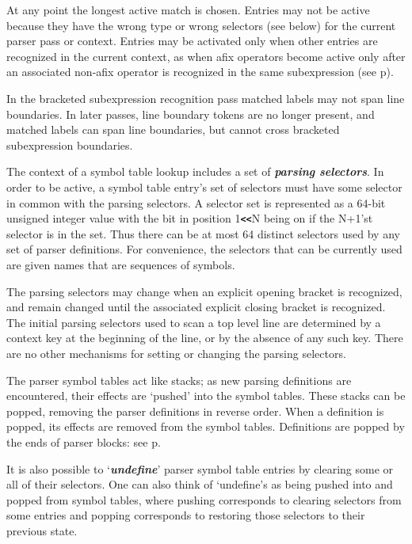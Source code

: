 \documentclass[12pt]{article}
\newcommand{\TT}[1]{{\tt \bfseries #1}}
\newcommand{\mkey}[2]{{\bf \em #1}\index{#1!#2}}
\newcommand{\skey}[2]{{\bf \em #1#2}\index{#1}}
\newcommand{\pagref}[1]{p\pageref{#1}}
\begin{document}
At any point the longest active match is chosen.  Entries may
not be active because they have the wrong type or wrong selectors (see below)
for the current parser pass or context.
Entries may be activated only when other entries are recognized
in the current context, as when afix operators become active
only after an associated non-afix operator is recognized in
the same subexpression (see \pagref{AFIX-OPERATOR}).

In the bracketed
subexpression recognition pass matched labels may not span line boundaries.
In later passes, line boundary tokens are no longer present, and
matched labels can span line boundaries,
but cannot cross bracketed subexpression
boundaries.

The context of a symbol table lookup includes a set of \skey{parsing selector}s.
In order to be active, a symbol table entry's set of selectors
must have some selector in common with the parsing selectors.
A selector set is represented as a 64-bit unsigned integer value
with the bit in
position 1\TT{<{}<}N being on if the N+1'st selector is in the set.
Thus there can be at most 64 distinct selectors used by any set of
parser definitions.  For convenience, the selectors that can be
currently used are given names that are sequences of symbols.

The parsing selectors may change when an explicit opening bracket
is recognized, and remain changed until the associated explicit closing
bracket is recognized.  The initial parsing selectors used to scan a
top level line are determined by a context key at the beginning of
the line, or by the absence of any such key.
There are no other mechanisms for setting or changing the
parsing selectors.

The parser symbol tables act like stacks; as new parsing
definitions are encountered, their effects are `pushed' into the
symbol tables.  These stacks can be popped, removing
the parser definitions in reverse order.  When a definition
is popped, its effects are removed from the symbol tables.
Definitions are popped by the ends of parser blocks: see
\pagref{PARSER-BLOCKS}.

It is also possible to `\mkey{undefine}{parser symbol table entry}'
parser symbol table entries by clearing some or all of their selectors.
One can also think of `undefine's as being pushed into and popped
from symbol tables,
where pushing corresponds to clearing selectors from some entries
and popping corresponds to restoring those selectors to their
previous state.
\end{document}
